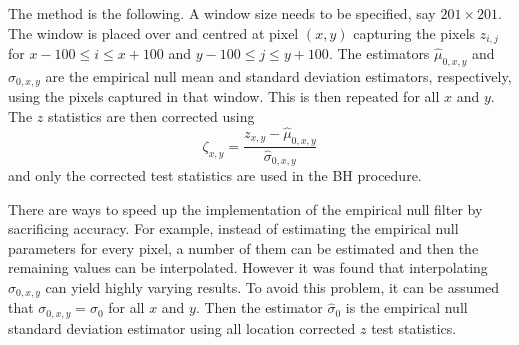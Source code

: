 The method is the following. A window size needs to be specified, say $201\times201$. The window is placed over and centred at pixel $(x,y)$ capturing the pixels $z_{i,j}$ for $x-100\leqslant i \leqslant x+100$ and $y-100\leqslant j \leqslant y+100$. The estimators $\widehat{\mu}_{0,x,y}$ and $\widehat{\sigma}_{0,x,y}$ are the empirical null mean and standard deviation estimators, respectively, using the pixels captured in that window. This is then repeated for all $x$ and $y$. The $z$ statistics are then corrected using
\begin{equation}
	\zeta_{x,y} = 
	\dfrac{
		z_{x,y}-\widehat{\mu}_{0,x,y}
	}
	{
		\widehat{\sigma}_{0,x,y}
	}
\end{equation}
and only the corrected test statistics are used in the BH procedure.

There are ways to speed up the implementation of the empirical null filter by sacrificing accuracy. For example, instead of estimating the empirical null parameters for every pixel, a number of them can be estimated and then the remaining values can be interpolated. However it was found that interpolating $\widehat{\sigma}_{0,x,y}$ can yield highly varying results. To avoid this problem, it can be assumed that $\sigma_{0,x,y}=\sigma_0$ for all $x$ and $y$. Then the estimator $\widehat{\sigma}_0$ is the empirical null standard deviation estimator using all location corrected $z$ test statistics.